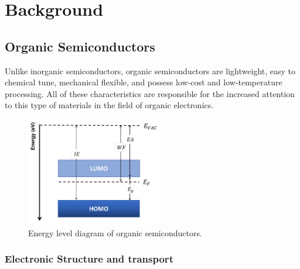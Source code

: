 \chapter{Background} \label{chap:background}

\section{Organic Semiconductors}

Unlike inorganic semiconductors, organic semiconductors are lightweight, easy to chemical tune, mechanical flexible, and possess low-cost and low-temperature processing. All of these characteristics are responsible for the increased attention to this type of materials in the field of organic electronics. 


\begin{figure}[h]
  \centering
  \includegraphics[width=6cm]{Images/pdf/ediagram.pdf}
  \caption[Energy level diagram of organic semiconductors]{Energy level diagram of organic semiconductors.}
  \label{fig:ediag}
\end{figure}

\subsection{Electronic Structure and transport} 

